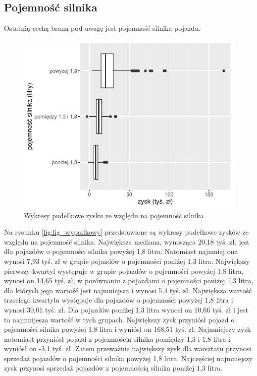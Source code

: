 \documentclass{article}\usepackage[]{graphicx}\usepackage[]{xcolor}
\makeatletter
\def\maxwidth{ %
  \ifdim\Gin@nat@width>\linewidth
    \linewidth
  \else
    \Gin@nat@width
  \fi
}
\newenvironment{knitrout}{}{} %
\makeatother
\begin{document}
\subsection{Pojemność silnika}

Ostatnią cechą braną pod uwagę jest pojemność silnika pojazdu.

\begin{knitrout}
\color{fgcolor}\begin{figure}[H]

{\centering \includegraphics[width=\maxwidth]{figure/fig_pojemnosc-1} 

}

\caption[Wykresy pudełkowe zysku ze względu na pojemność silnika]{Wykresy pudełkowe zysku ze względu na pojemność silnika}\label{fig:fig_pojemnosc}
\end{figure}

\end{knitrout}

Na rysunku \ref{fig:fig_wypadkowy} przedstawione są wykresy pudełkowe zysków ze względu na pojemność silnika. Największa mediana, wynosząca 20,18 tyś. zł, jest dla pojazdów o pojemności silnika powyżej 1,8 litra. Natomiast najmniej ona wynosi 7,93 tyś. zł w grupie pojazdów o pojemności poniżej 1,3 litra. 
Największy pierwszy kwartyl występuje w grupie pojazdów o pojemności powyżej 1,8 litra, wynosi on 14,65 tyś. zł, w porównaniu z pojazdami o pojemności poniżej 1,3 litra, dla których jego wartość jest najmniejsza i wynosi 5,4 tyś. zł.
Największa wartość trzeciego kwartylu występuje dla pojazdów o pojemności powyżej 1,8 litra i wynosi 30,01 tyś. zł. Dla pojazdów poniżej 1,3 litra wynosi on 10,66 tyś. zł i jest to najmnijesza wartość w tych grupach.
Największy zysk przyniósł pojazd o pojemności silnika powyżej 1,8 litra i wyniósł on 168,51 tyś. zł. 
Najmniejszy zysk natomiast przyniósł pojazd z pojemnością silnika pomiędzy 1,3 i 1,8 litra i wyniósł on -3,1 tyś. zł. Zatem przeważnie największy zysk dla warsztatu przynosi sprzedaż pojazdów o pojemności silnika powyżej 1,8 litra. Najczęściej najmniejszy zysk przynosi sprzedaż pojazdów z pojemnością silnika poniżej 1,3 litra.
\end{document}
